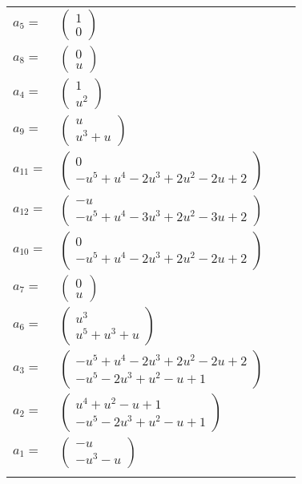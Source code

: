 \documentclass[1p]{elsarticle_modified}
\theoremstyle{definition}
\begin{document}
\begin{tabular}{m{7pt} m{180pt} m{7pt} m{180pt} }
\flushright $a_{5}=$&$\begin{pmatrix}1\\0\end{pmatrix}$ \\
\flushright $a_{8}=$&$\begin{pmatrix}0\\u\end{pmatrix}$ \\
\flushright $a_{4}=$&$\begin{pmatrix}1\\u^2\end{pmatrix}$ \\
\flushright $a_{9}=$&$\begin{pmatrix}u\\u^3+u\end{pmatrix}$ \\
\flushright $a_{11}=$&$\begin{pmatrix}0\\- u^5+u^4-2 u^3+2 u^2-2 u+2\end{pmatrix}$ \\
\flushright $a_{12}=$&$\begin{pmatrix}- u\\- u^5+u^4-3 u^3+2 u^2-3 u+2\end{pmatrix}$ \\
\flushright $a_{10}=$&$\begin{pmatrix}0\\- u^5+u^4-2 u^3+2 u^2-2 u+2\end{pmatrix}$ \\
\flushright $a_{7}=$&$\begin{pmatrix}0\\u\end{pmatrix}$ \\
\flushright $a_{6}=$&$\begin{pmatrix}u^3\\u^5+u^3+u\end{pmatrix}$ \\
\flushright $a_{3}=$&$\begin{pmatrix}- u^5+u^4-2 u^3+2 u^2-2 u+2\\- u^5-2 u^3+u^2- u+1\end{pmatrix}$ \\
\flushright $a_{2}=$&$\begin{pmatrix}u^4+u^2- u+1\\- u^5-2 u^3+u^2- u+1\end{pmatrix}$ \\
\flushright $a_{1}=$&$\begin{pmatrix}- u\\- u^3- u\end{pmatrix}$\\&\end{tabular}
\end{document}
